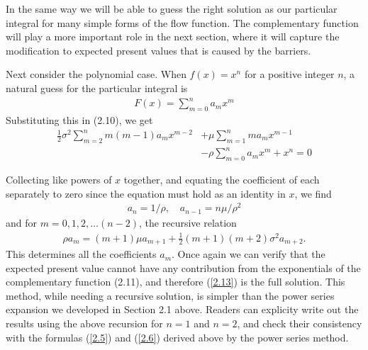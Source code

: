 \documentclass[12pt]{article}
\theoremstyle{definition}
\begin{document}
In the same way we will be able to guess the right solution as our particular integral for many simple forms of the flow function. The complementary function will play a more important role in the next section, where it will capture the modification to expected present values that is caused by the barriers. 

Next consider the polynomial case. When $f(x)=x^{n}$ for a positive integer $n$, a natural guess for the particular integral is
\begin{align}
F(x)=\sum_{m=0}^{n} a_{m} x^{m} \label{2.13}
\end{align}
Substituting this in (2.10), we get
\begin{align*}
\frac{1}{2} \sigma^{2} \sum_{m=2}^{n} m(m-1) a_{m} x^{m-2} & +\mu \sum_{m=1}^{n} m a_{m} x^{m-1} \\
& -\rho \sum_{m=0}^{n} a_{m} x^{m}+x^{n}=0
\end{align*}

Collecting like powers of $x$ together, and equating the coefficient of each separately to zero since the equation must hold as an identity in $x$, we find
\begin{align*}
a_{n}=1 / \rho, \quad a_{n-1}=n \mu / \rho^{2}
\end{align*}
and for $m=0,1,2, \ldots(n-2)$, the recursive relation
\begin{align}
\rho a_{m}=(m+1) \mu a_{m+1}+\frac{1}{2}(m+1)(m+2) \sigma^{2} a_{m+2}. \label{2.14}
\end{align}
This determines all the coefficients $a_{m}$. Once again we can verify that the expected present value cannot have any contribution from the exponentials of the complementary function (2.11), and therefore (\ref{2.13}) is the full solution. This method, while needing a recursive solution, is simpler than the power series expansion we developed in Section 2.1 above. Readers can explicity write out the results using the above recursion for $n=1$ and $n=2$, and check their consistency with the formulas (\ref{2.5}) and (\ref{2.6}) derived above by the power series method.
\end{document}
